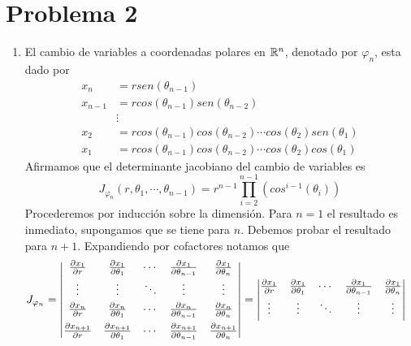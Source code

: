 \documentclass{article}
\begin{document}
\section*{Problema 2}
\begin{enumerate}
    \item El cambio de variables a coordenadas polares en $\mathbb{R}^{n}$, denotado por $\varphi_{n}$, 
    esta dado por
    \begin{align*}
        x_{n} &= rsen(\theta_{n-1}) \\
        x_{n-1} &= rcos(\theta_{n-1})sen(\theta_{n-2}) \\
        &\vdots \\
        x_{2} &= rcos(\theta_{n-1})cos(\theta_{n-2})\cdots cos(\theta_{2})sen(\theta_{1}) \\
        x_{1} &= rcos(\theta_{n-1})cos(\theta_{n-2})\cdots cos(\theta_{2})cos(\theta_{1})
    \end{align*}
    Afirmamos que el determinante jacobiano del cambio de variables es
    \begin{equation*}
        J_{\varphi_{n}}(r,\theta_{1},\cdots,\theta_{n-1})=r^{n-1}
        \prod_{i=2}^{n-1}(cos^{i-1}(\theta_{i}))
    \end{equation*}
    Procederemos por inducción sobre la dimensión. Para $n=1$ el resultado es inmediato, 
    supongamos que se tiene para $n$. Debemos probar el resultado para $n+1$. Expandiendo por
    cofactores notamos que
    \begin{align*}
        J_{\varphi_{n}} &= \begin{vmatrix}
            \frac{\partial x_{1}}{\partial r} & \frac{\partial x_{1}}{\partial\theta_{1}} & \cdots & \frac{\partial x_{1}}{\partial\theta_{n-1}} & 
            \frac{\partial x_{1}}{\partial\theta_{n}} \\[1mm]
            \vdots & \vdots & \ddots & \vdots & \vdots \\[1mm]
            \frac{\partial x_{n}}{\partial r} & \frac{\partial x_{n}}{\partial\theta_{1}} & \cdots & \frac{\partial x_{n}}{\partial\theta_{n-1}} & 
            \frac{\partial x_{n}}{\partial\theta_{n}} \\[2mm]
            \frac{\partial x_{n+1}}{\partial r} & \frac{\partial x_{n+1}}{\partial\theta_{1}} & \cdots & \frac{\partial x_{n+1}}{\partial\theta_{n-1}} & 
            \frac{\partial x_{n+1}}{\partial\theta_{n}}
        \end{vmatrix}=
        \begin{vmatrix}
            \frac{\partial x_{1}}{\partial r} & \frac{\partial x_{1}}{\partial\theta_{1}} & \cdots & \frac{\partial x_{1}}{\partial\theta_{n-1}} & 
            \frac{\partial x_{1}}{\partial\theta_{n}} \\[1mm]
            \vdots & \vdots & \ddots & \vdots & \vdots \\[1mm]

\end{vmatrix}
\end{align*}
\end{enumerate}
\end{document}
